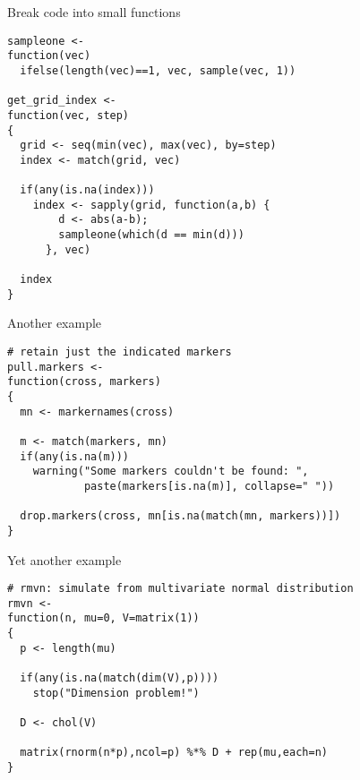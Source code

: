 \documentclass[12pt,t]{beamer}
\begin{document}
\begin{frame}[fragile,c]{Break code into small functions}

\begin{lstlisting}
sampleone <-
function(vec)
  ifelse(length(vec)==1, vec, sample(vec, 1))

get_grid_index <-
function(vec, step)
{
  grid <- seq(min(vec), max(vec), by=step)
  index <- match(grid, vec)

  if(any(is.na(index)))
    index <- sapply(grid, function(a,b) {
        d <- abs(a-b);
        sampleone(which(d == min(d)))
      }, vec)

  index
}
\end{lstlisting}


\end{frame}


\begin{frame}[fragile,c]{Another example}

\begin{lstlisting}
# retain just the indicated markers
pull.markers <-
function(cross, markers)
{
  mn <- markernames(cross)

  m <- match(markers, mn)
  if(any(is.na(m)))
    warning("Some markers couldn't be found: ",
            paste(markers[is.na(m)], collapse=" "))

  drop.markers(cross, mn[is.na(match(mn, markers))])
}
\end{lstlisting}

\end{frame}


\begin{frame}[fragile,c]{Yet another example}

\begin{lstlisting}
# rmvn: simulate from multivariate normal distribution
rmvn <-
function(n, mu=0, V=matrix(1))
{
  p <- length(mu)

  if(any(is.na(match(dim(V),p))))
    stop("Dimension problem!")

  D <- chol(V)

  matrix(rnorm(n*p),ncol=p) %*% D + rep(mu,each=n)
}
\end{lstlisting}
\end{frame}
\end{document}
